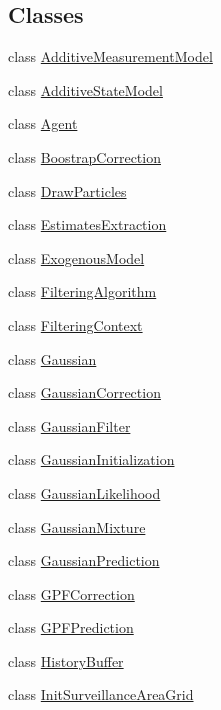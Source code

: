 \subsection*{Classes}
\begin{DoxyCompactItemize}
\item 
class \mbox{\hyperlink{classbfl_1_1AdditiveMeasurementModel}{Additive\+Measurement\+Model}}
\item 
class \mbox{\hyperlink{classbfl_1_1AdditiveStateModel}{Additive\+State\+Model}}
\item 
class \mbox{\hyperlink{classbfl_1_1Agent}{Agent}}
\item 
class \mbox{\hyperlink{classbfl_1_1BoostrapCorrection}{Boostrap\+Correction}}
\item 
class \mbox{\hyperlink{classbfl_1_1DrawParticles}{Draw\+Particles}}
\item 
class \mbox{\hyperlink{classbfl_1_1EstimatesExtraction}{Estimates\+Extraction}}
\item 
class \mbox{\hyperlink{classbfl_1_1ExogenousModel}{Exogenous\+Model}}
\item 
class \mbox{\hyperlink{classbfl_1_1FilteringAlgorithm}{Filtering\+Algorithm}}
\item 
class \mbox{\hyperlink{classbfl_1_1FilteringContext}{Filtering\+Context}}
\item 
class \mbox{\hyperlink{classbfl_1_1Gaussian}{Gaussian}}
\item 
class \mbox{\hyperlink{classbfl_1_1GaussianCorrection}{Gaussian\+Correction}}
\item 
class \mbox{\hyperlink{classbfl_1_1GaussianFilter}{Gaussian\+Filter}}
\item 
class \mbox{\hyperlink{classbfl_1_1GaussianInitialization}{Gaussian\+Initialization}}
\item 
class \mbox{\hyperlink{classbfl_1_1GaussianLikelihood}{Gaussian\+Likelihood}}
\item 
class \mbox{\hyperlink{classbfl_1_1GaussianMixture}{Gaussian\+Mixture}}
\item 
class \mbox{\hyperlink{classbfl_1_1GaussianPrediction}{Gaussian\+Prediction}}
\item 
class \mbox{\hyperlink{classbfl_1_1GPFCorrection}{G\+P\+F\+Correction}}
\item 
class \mbox{\hyperlink{classbfl_1_1GPFPrediction}{G\+P\+F\+Prediction}}
\item 
class \mbox{\hyperlink{classbfl_1_1HistoryBuffer}{History\+Buffer}}
\item 
class \mbox{\hyperlink{classbfl_1_1InitSurveillanceAreaGrid}{Init\+Surveillance\+Area\+Grid}}

\end{DoxyCompactItemize}
